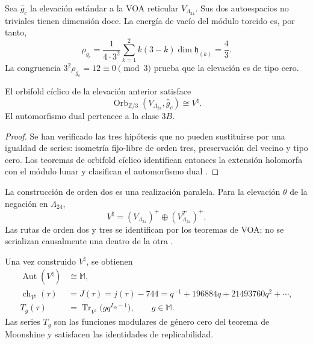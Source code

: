 Sea \(\widehat g_c\) la elevación estándar a la VOA reticular
\(V_{\Lambda_{24}}\). Sus dos autoespacios no triviales tienen dimensión
doce. La energía de vacío del módulo torcido es, por tanto,
\begin{equation}
 \rho_{g_c}
 =\frac1{4\cdot3^2}
 \sum_{k=1}^{2}k(3-k)\dim\mathfrak h_{(k)}
 =\frac43.
 \label{eq:exc-peso-torcido}
\end{equation}
La congruencia \(3^2\rho_{g_c}=12\equiv0\pmod3\) prueba que la elevación
es de tipo cero.

\begin{theorem}
\label{thm:exc-orbifold}
El orbifold cíclico de la elevación anterior satisface
\begin{equation}
 \operatorname{Orb}_{\mathbb Z/3}
 (V_{\Lambda_{24}},\widehat g_c)\cong V^\natural.
 \label{eq:exc-orbifold}
\end{equation}
El automorfismo dual pertenece a la clase \(3B\).
\end{theorem}

\begin{proof}
Se han verificado las tres hipótesis que no pueden sustituirse por una
igualdad de series: isometría fijo-libre de orden tres, preservación del
vecino y tipo cero. Los teoremas de orbifold cíclico identifican entonces
la extensión holomorfa con el módulo lunar y clasifican el automorfismo dual
\citep{ChenLamShimakura2016,AbeLamYamada2017,Carnahan2017}.
\end{proof}

La construcción de orden dos es una realización paralela. Para la elevación
\(\theta\) de la negación en \(\Lambda_{24}\),
\begin{equation}
 V^\natural=(V_{\Lambda_{24}})^+
 \oplus(V_{\Lambda_{24}}^T)^+.
 \label{eq:exc-flm}
\end{equation}
Las rutas de orden dos y tres se identifican por los teoremas de VOA; no se
serializan causalmente una dentro de la otra \citep{FLM1988}.

\begin{theorem}
\label{thm:exc-moonshine}
Una vez construido \(V^\natural\), se obtienen
\begin{align}
 \operatorname{Aut}(V^\natural)&\cong\mathbb M,
 \label{eq:exc-aut-monster}\\
 \operatorname{ch}_{V^\natural}(\tau)
 &=J(\tau)=j(\tau)-744
 =q^{-1}+196884q+21493760q^2+\cdots,
 \label{eq:exc-caracter-j}\\
 T_g(\tau)&=\operatorname{Tr}_{V^\natural}
 \bigl(gq^{L_0-1}\bigr),\qquad g\in\mathbb M.
 \label{eq:exc-mckay-thompson}
\end{align}
Las series \(T_g\) son las funciones modulares de género cero del teorema
de Moonshine y satisfacen las identidades de replicabilidad.
\end{theorem}

